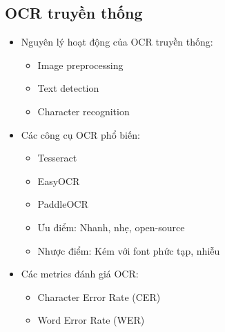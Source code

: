 \subsection{OCR truyền thống}
\begin{itemize}
    \item Nguyên lý hoạt động của OCR truyền thống:
    \begin{itemize}
        \item Image preprocessing
        \item Text detection
        \item Character recognition
    \end{itemize}
    \item Các công cụ OCR phổ biến:
    \begin{itemize}
        \item Tesseract
        \item EasyOCR
        \item PaddleOCR
    \end{itemize}
    \begin{itemize}
        \item Ưu điểm: Nhanh, nhẹ, open-source
        \item Nhược điểm: Kém với font phức tạp, nhiễu
    \end{itemize}
    \item Các metrics đánh giá OCR:
    \begin{itemize}
        \item Character Error Rate (CER)
        \item Word Error Rate (WER)
    \end{itemize}
\end{itemize}

